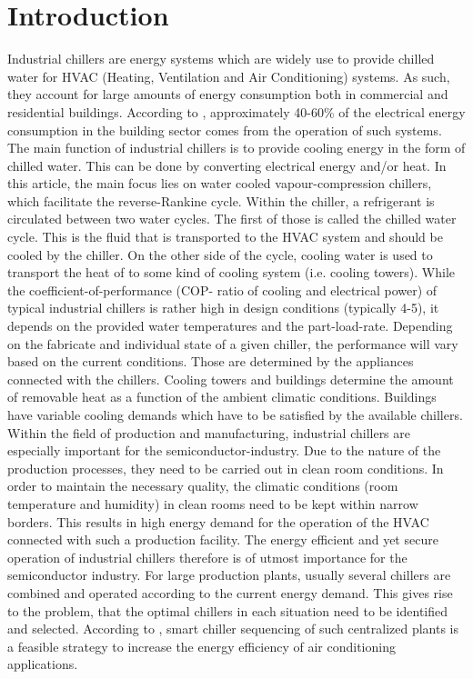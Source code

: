 \documentclass[3p,times,procedia,twocolumn,twoside]{elsarticle}
\begin{document}
\section{Introduction}
\label{main}
Industrial chillers are energy systems which are widely use to provide chilled water for HVAC (Heating, Ventilation and Air Conditioning) systems. As such, they account for large amounts of energy consumption both in commercial and residential buildings. According to \cite{Thangavelu2017}, approximately 40-60\% of the electrical energy consumption in the building sector comes from the operation of such systems.\\
The main function of industrial chillers is to provide cooling energy in the form of chilled water. This can be done by converting electrical energy and/or heat. In this article, the main focus lies on water cooled vapour-compression chillers, which facilitate the reverse-Rankine cycle. Within the chiller, a refrigerant is circulated between two water cycles.  The first of those is called the chilled water cycle. This is the fluid that is transported to the HVAC system and should be cooled by the chiller. On the other side of the cycle, cooling water is used to transport the heat of to some kind of cooling system (i.e. cooling towers). While the coefficient-of-performance (COP- ratio of cooling and electrical power) of typical industrial chillers is rather high in design conditions (typically 4-5), it depends on the provided water temperatures and the part-load-rate. Depending on the fabricate and individual state of a given chiller, the performance will vary based on the current conditions. Those are determined by the appliances connected with the chillers. Cooling towers and buildings determine the amount of removable heat as a function of the ambient climatic conditions. Buildings have variable cooling demands which have to be satisfied by the available chillers.\\
Within the field of production and manufacturing, industrial chillers are especially important for the semiconductor-industry. Due to the nature of the production processes, they need to be carried out in clean room conditions. In order to maintain the necessary quality, the climatic conditions (room temperature and humidity) in clean rooms need to be kept within narrow borders. This results in high energy demand for the operation of the HVAC connected with such a production facility. The energy efficient and yet secure operation of industrial chillers therefore is of utmost importance for the semiconductor industry. For large production plants, usually several chillers are combined and operated according to the current energy demand. This gives rise to the problem, that the optimal chillers in each situation need to be identified and selected. According to \cite{Chua2013}, smart chiller sequencing of such centralized plants is a feasible strategy to increase the energy efficiency of air conditioning applications.\\
\end{document}
